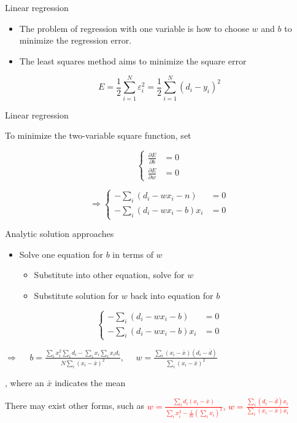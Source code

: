 \documentclass[notes]{beamer}
\providecommand{\tightlist}{%
  \setlength{\itemsep}{0pt}\setlength{\parskip}{0pt}}
\begin{document}
\begin{frame}{Linear regression}

\begin{itemize}
\tightlist
\item
  The problem of regression with one variable is how to choose \(w\) and
  \(b\) to minimize the regression error.
\item
  The least squares method aims to minimize the square error
\end{itemize}

\[E=\frac{1}{2}\sum_{i=1}^{N} \varepsilon_i^2 = \frac{1}{2} \sum_{i=1}^{N} (d_i -y_i)^2\]

\end{frame}

\begin{frame}{Linear regression}

To minimize the two-variable square function, set

\[\left\{\begin{array}{cc}
\frac{\partial E}{\partial b} & =0 \\ 
\frac{\partial E}{\partial w} & =0 
\end{array} \right.\]

\[\Rightarrow \left\{\begin{array}{cc}
-\sum_{i}(d_i -wx_i -n) & =0 \\  
-\sum_{i} (d_i -wx_i -b) x_i & =0 
\end{array} \right.\]

\end{frame}

\begin{frame}{Analytic solution approaches}

\begin{itemize}
\tightlist
\item
  Solve one equation for \(b\) in terms of \(w\)

  \begin{itemize}
  \tightlist
  \item
    Substitute into other equation, solve for \(w\)
  \item
    Substitute solution for \(w\) back into equation for \(b\)
  \end{itemize}
\end{itemize}

\[\left\{\begin{array}{cc}
-\sum_{i}(d_i -wx_i -b) & =0 \\  
-\sum_{i} (d_i -wx_i -b) x_i & =0 
\end{array} \right.\]

\(\Rightarrow \quad\) \pause
\(b=\frac{\sum_i x_i^2 \sum_i d_i - \sum_i x_i \sum_i x_i d_i}{N \sum_i (x_i - \bar{x} )^2} , \quad\)
\(w=\frac{\sum_i (x_i - \bar{x}) (d_i - \bar{d}) }{\sum_i (x_i - \bar{x} )^2 }\)

, where an \(\bar{x}\) indicates the mean

There may exist other forms, such as \textcolor{red}{
$w=\frac{\sum_i d_i (x_i-\bar{x})}{\sum_i x_i^2 - \frac{1}{m} (\sum_i x_i)^2 }$, 
$w=\frac{\sum_i(d_i-\bar{d})x_i}{\sum_i (x_i-\bar{x})x_i}$ 
}

\end{frame}
\end{document}
